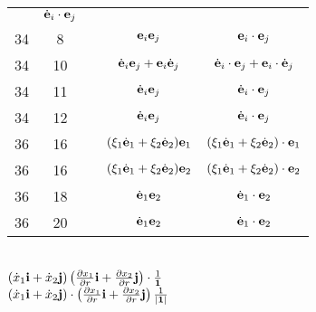 \documentclass[a4paper,11pt]{article}
\begin{document}
\begin{center}
\begin{tabular}{|c|c|c|c|c|}
           & $\dot{ \mathbf{e} }_{ i } \cdot \mathbf{e}_{ j }$ \\
    34  &  8 & & $\mathbf{e}_{ i } \mathbf{e}_{ j }$
           & $\mathbf{e}_{ i } \cdot \mathbf{e}_{ j }$ \\
    34  & 10 & & $\dot{ \mathbf{e} }_{ i } \mathbf{e}_{ j }
                 + \mathbf{e}_{ i } \dot{ \mathbf{e} }_{ j }$
           & $\dot{ \mathbf{e} }_{ i } \cdot \mathbf{e}_{ j }
             + \mathbf{e}_{ i } \cdot \dot{ \mathbf{e} }_{ j }$ \\
    34  & 11 & & $\dot{ \mathbf{e} }_{ i } \mathbf{e}_{ j }$
           & $\dot{ \mathbf{e} }_{ i } \cdot \mathbf{e}_{ j }$ \\
    34  & 12 & & $\dot{ \mathbf{e} }_{ i } \mathbf{e}_{ j }$
           & $\dot{ \mathbf{e} }_{ i } \cdot \mathbf{e}_{ j }$ \\
    36  & 16 & & $( \xi_{ 1 } \dot{ \mathbf{e} }_{ 1 }
                 + \xi_{ 2 } \dot{ \mathbf{e} }_{ 2 }  ) \mathbf{e}_{ 1 }$
           & $( \xi_{ 1 } \dot{ \mathbf{e} }_{ 1 }
             + \xi_{ 2 } \dot{ \mathbf{e} }_{ 2 }  ) \cdot \mathbf{e}_{ 1 }$ \\
    36  & 16 & & $( \xi_{ 1 } \dot{ \mathbf{e} }_{ 1 }
                 + \xi_{ 2 } \dot{ \mathbf{e} }_{ 2 }  ) \mathbf{e}_{ 2 }$
           & $( \xi_{ 1 } \dot{ \mathbf{e} }_{ 1 }
             + \xi_{ 2 } \dot{ \mathbf{e} }_{ 2 }  ) \cdot \mathbf{e}_{ 2 }$ \\
    36  & 18 & & $\dot{ \mathbf{e} }_{ 1 } \mathbf{e}_{ 2 }$
           & $\dot{ \mathbf{e} }_{ 1 } \cdot \mathbf{e}_{ 2 }$ \\
    36  & 20 & & $\dot{ \mathbf{e} }_{ 1 } \mathbf{e}_{ 2 }$
           & $\dot{ \mathbf{e} }_{ 1 } \cdot \mathbf{e}_{ 2 }$ \\
    \hline
  \end{tabular}

\end{center}

\vspace{\spaceTwo}


\noindent
{} \\[0.3em]
\Jest
$( \dot{ x }_{ 1 } \mathbf{i} + \dot{ x }_{ 2 } \mathbf{j} )
\left( \frac{ \partial x_{ 1 } }{ \partial r } \mathbf{i}
  + \frac{ \partial x_{ 2 } }{ \partial r } \mathbf{j} \right)
\cdot \frac{ 1 }{ \mathbf{1} }$ \\[0.5em]
\Powin
$( \dot{ x }_{ 1 } \mathbf{i} + \dot{ x }_{ 2 } \mathbf{j} )
\cdot \left( \frac{ \partial x_{ 1 } }{ \partial r } \mathbf{i}
  + \frac{ \partial x_{ 2 } }{ \partial r } \mathbf{j} \right)
\frac{ 1 }{ | \mathbf{1} | }$ \\
\end{document}
